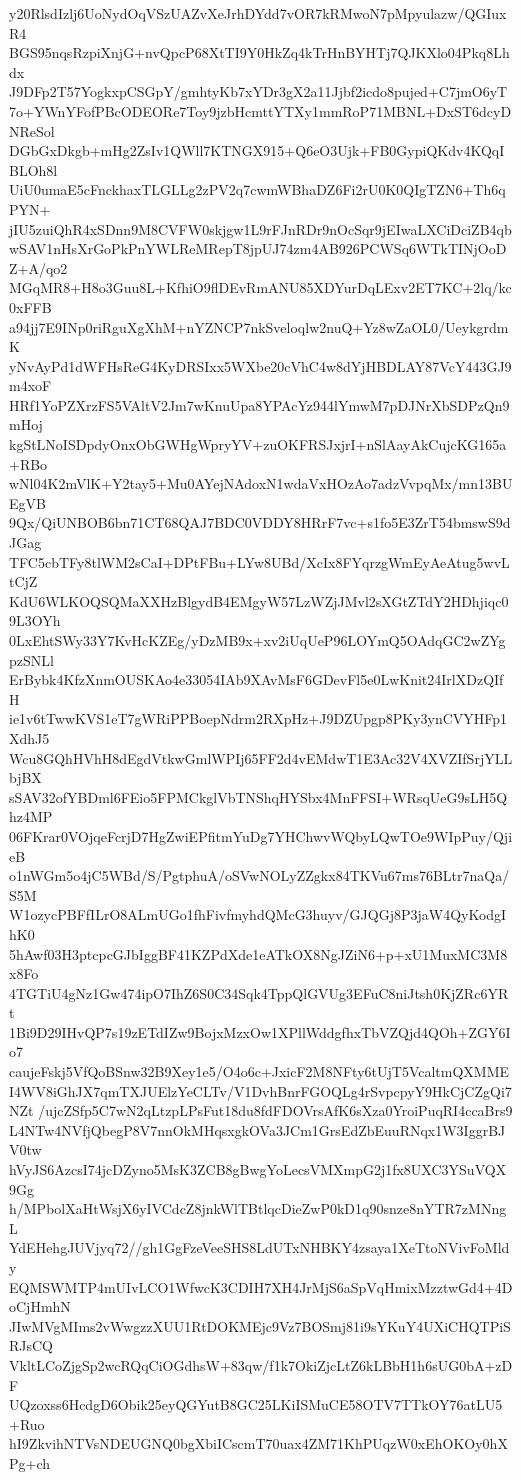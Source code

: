 y20RlsdIzlj6UoNydOqVSzUAZvXeJrhDYdd7vOR7kRMwoN7pMpyulazw/QGIuxR4
BGS95nqsRzpiXnjG+nvQpcP68XtTI9Y0HkZq4kTrHnBYHTj7QJKXlo04Pkq8Lhdx
J9DFp2T57YogkxpCSGpY/gmhtyKb7xYDr3gX2a11Jjbf2icdo8pujed+C7jmO6yT
7o+YWnYFofPBcODEORe7Toy9jzbHcmttYTXy1mmRoP71MBNL+DxST6dcyDNReSol
DGbGxDkgb+mHg2ZsIv1QWll7KTNGX915+Q6eO3Ujk+FB0GypiQKdv4KQqIBLOh8l
UiU0umaE5cFnckhaxTLGLLg2zPV2q7cwmWBhaDZ6Fi2rU0K0QIgTZN6+Th6qPYN+
jIU5zuiQhR4xSDnn9M8CVFW0skjgw1L9rFJnRDr9nOcSqr9jEIwaLXCiDciZB4qb
wSAV1nHsXrGoPkPnYWLReMRepT8jpUJ74zm4AB926PCWSq6WTkTINjOoDZ+A/qo2
MGqMR8+H8o3Guu8L+KfhiO9flDEvRmANU85XDYurDqLExv2ET7KC+2lq/kc0xFFB
a94jj7E9INp0riRguXgXhM+nYZNCP7nkSveloqlw2nuQ+Yz8wZaOL0/UeykgrdmK
yNvAyPd1dWFHsReG4KyDRSIxx5WXbe20cVhC4w8dYjHBDLAY87VcY443GJ9m4xoF
HRf1YoPZXrzFS5VAltV2Jm7wKnuUpa8YPAcYz944lYmwM7pDJNrXbSDPzQn9mHoj
kgStLNoISDpdyOnxObGWHgWpryYV+zuOKFRSJxjrI+nSlAayAkCujcKG165a+RBo
wNl04K2mVlK+Y2tay5+Mu0AYejNAdoxN1wdaVxHOzAo7adzVvpqMx/mn13BUEgVB
9Qx/QiUNBOB6bn71CT68QAJ7BDC0VDDY8HRrF7vc+s1fo5E3ZrT54bmswS9dJGag
TFC5cbTFy8tlWM2sCaI+DPtFBu+LYw8UBd/XcIx8FYqrzgWmEyAeAtug5wvLtCjZ
KdU6WLKOQSQMaXXHzBlgydB4EMgyW57LzWZjJMvl2sXGtZTdY2HDhjiqc09L3OYh
0LxEhtSWy33Y7KvHcKZEg/yDzMB9x+xv2iUqUeP96LOYmQ5OAdqGC2wZYgpzSNLl
ErBybk4KfzXnmOUSKAo4e33054IAb9XAvMsF6GDevFl5e0LwKnit24IrlXDzQIfH
ie1v6tTwwKVS1eT7gWRiPPBoepNdrm2RXpHz+J9DZUpgp8PKy3ynCVYHFp1XdhJ5
Wcu8GQhHVhH8dEgdVtkwGmlWPIj65FF2d4vEMdwT1E3Ac32V4XVZIfSrjYLLbjBX
sSAV32ofYBDml6FEio5FPMCkglVbTNShqHYSbx4MnFFSI+WRsqUeG9sLH5Qhz4MP
06FKrar0VOjqeFcrjD7HgZwiEPfitmYuDg7YHChwvWQbyLQwTOe9WIpPuy/QjieB
o1nWGm5o4jC5WBd/S/PgtphuA/oSVwNOLyZZgkx84TKVu67ms76BLtr7naQa/S5M
W1ozycPBFfILrO8ALmUGo1fhFivfmyhdQMcG3huyv/GJQGj8P3jaW4QyKodgIhK0
5hAwf03H3ptcpcGJbIggBF41KZPdXde1eATkOX8NgJZiN6+p+xU1MuxMC3M8x8Fo
4TGTiU4gNz1Gw474ipO7IhZ6S0C34Sqk4TppQlGVUg3EFuC8niJtsh0KjZRc6YRt
1Bi9D29IHvQP7s19zETdIZw9BojxMzxOw1XPllWddgfhxTbVZQjd4QOh+ZGY6Io7
caujeFskj5VfQoBSnw32B9Xey1e5/O4o6c+JxicF2M8NFty6tUjT5VcaltmQXMME
I4WV8iGhJX7qmTXJUElzYeCLTv/V1DvhBnrFGOQLg4rSvpcpyY9HkCjCZgQi7NZt
/ujcZSfp5C7wN2qLtzpLPsFut18du8fdFDOVrsAfK6sXza0YroiPuqRI4ccaBrs9
L4NTw4NVfjQbegP8V7nnOkMHqsxgkOVa3JCm1GrsEdZbEuuRNqx1W3IggrBJV0tw
hVyJS6AzcsI74jcDZyno5MsK3ZCB8gBwgYoLecsVMXmpG2j1fx8UXC3YSuVQX9Gg
h/MPbolXaHtWsjX6yIVCdcZ8jnkWlTBtlqcDieZwP0kD1q90snze8nYTR7zMNngL
YdEHehgJUVjyq72//gh1GgFzeVeeSHS8LdUTxNHBKY4zsaya1XeTtoNVivFoMldy
EQMSWMTP4mUIvLCO1WfwcK3CDIH7XH4JrMjS6aSpVqHmixMzztwGd4+4DoCjHmhN
JIwMVgMIms2vWwgzzXUU1RtDOKMEjc9Vz7BOSmj81i9sYKuY4UXiCHQTPiSRJsCQ
VkltLCoZjgSp2wcRQqCiOGdhsW+83qw/f1k7OkiZjcLtZ6kLBbH1h6sUG0bA+zDF
UQzoxss6HcdgD6Obik25eyQGYutB8GC25LKiISMuCE58OTV7TTkOY76atLU5+Ruo
hI9ZkvihNTVsNDEUGNQ0bgXbiICscmT70uax4ZM71KhPUqzW0xEhOKOy0hXPg+ch
